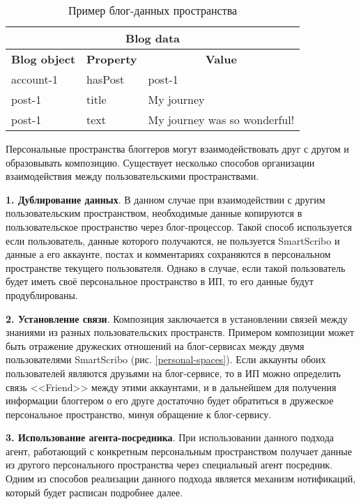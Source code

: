\begin{table}[h]
\caption{Пример блог-данных пространства}
\begin{center}
\begin{tabular}{|l|l|l|}
\hline
\multicolumn{3}{|c|}{\bf Blog data} \\
\hline
\multicolumn{1}{|c|}{\bf Blog object} & \multicolumn{1}{|c|}{\bf Property} & \multicolumn{1}{|c|}{\bf Value} \\
\hline
account-1 & hasPost & post-1 \\
\hline
post-1 & title & My journey \\
\hline
post-1 & text & My journey was so wonderful! \\
\hline
\end{tabular}
\end{center}
\label{tspace2}
\end{table}
\newpage
Персональные пространства блоггеров могут взаимодействовать друг с другом и образовывать композицию. Существует несколько способов организации взаимодействия между пользовательскими пространствами.

{\bf 1. Дублирование данных}.
В данном случае при взаимодействии с другим пользовательским пространством, необходимые данные копируются в пользовательское пространство через блог-процессор. Такой способ используется если пользователь, данные которого получаются, не пользуется SmartScribo и данные а его аккаунте, постах и комментариях сохраняются в персональном пространстве текущего пользователя. Однако в случае, если такой пользователь будет иметь своё персональное пространство в ИП, то его данные будут продублированы.

{\bf 2. Установление связи}.
Композиция заключается в установлении связей между знаниями из разных пользовательских пространств. Примером композиции может быть отражение дружеских отношений на блог-сервисах между двумя пользователями SmartScribo (рис. \ref{personal-spaces}). 
Если аккаунты обоих пользователей являются друзьями на блог-сервисе, то в ИП можно определить связь <<Friend>> между этими аккаунтами, и в дальнейшем для получения информации блоггером о его друге достаточно будет обратиться в дружеское персональное пространство, минуя обращение к блог-сервису.

{\bf 3. Использование агента-посредника}.
При использовании данного подхода агент, работающий с конкретным персональным пространством получает данные из другого персонального пространства через специальный агент посредник. Одним из способов реализации данного подхода является механизм нотификаций, который будет расписан подробнее далее.

